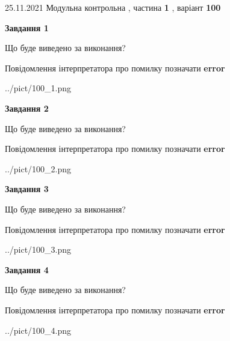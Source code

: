 \documentclass[10pt, ukrainian]{article}
\begin{document}
{25.11.2021 Модульна контрольна , частина \textbf { 1 }, варіант  \No \textbf { 100 }\par}
{
\begin {large}

{\begin {center}\textbf{Завдання 1}\end {center}}\par
Що буде виведено за виконання? \par
Повідомлення інтерпретатора про помилку позначати \textbf{error}

\begin{center}
	{../pict/100_1.png}
\end{center}
\newpage

{\begin {center}\textbf{Завдання 2}\end {center}}\par
Що буде виведено за виконання? \par
Повідомлення інтерпретатора про помилку позначати \textbf{error}

\begin{center}
	{../pict/100_2.png}
\end{center}
\newpage

{\begin {center}\textbf{Завдання 3}\end {center}}\par
Що буде виведено за виконання? \par
Повідомлення інтерпретатора про помилку позначати \textbf{error}

\begin{center}
	{../pict/100_3.png}
\end{center}
\newpage

{\begin {center}\textbf{Завдання 4}\end {center}}\par
Що буде виведено за виконання? \par
Повідомлення інтерпретатора про помилку позначати \textbf{error}

\begin{center}
	{../pict/100_4.png}
\end{center}
\newpage


\end{large}}
\end{document}
